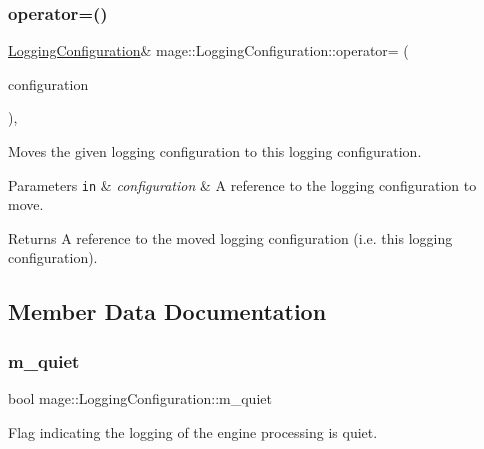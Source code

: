 \subsubsection{\texorpdfstring{operator=()}{operator=()}\hspace{0.1cm}{\footnotesize\ttfamily [2/2]}}
{\footnotesize\ttfamily \mbox{\hyperlink{classmage_1_1_logging_configuration}{Logging\+Configuration}}\& mage\+::\+Logging\+Configuration\+::operator= (\begin{DoxyParamCaption}\item[{\mbox{\hyperlink{classmage_1_1_logging_configuration}{Logging\+Configuration}} \&\&}]{configuration }\end{DoxyParamCaption})\hspace{0.3cm}{\ttfamily [default]}, {\ttfamily [noexcept]}}

Moves the given logging configuration to this logging configuration.


\begin{DoxyParams}[1]{Parameters}
\mbox{\tt in}  & {\em configuration} & A reference to the logging configuration to move. \\
\hline
\end{DoxyParams}
\begin{DoxyReturn}{Returns}
A reference to the moved logging configuration (i.\+e. this logging configuration). 
\end{DoxyReturn}


\subsection{Member Data Documentation}
\mbox{\label{classmage_1_1_logging_configuration_a38f457d5db84d15e008841ca8653b47c}} 
\subsubsection{\texorpdfstring{m\+\_\+quiet}{m\_quiet}}
{\footnotesize\ttfamily bool mage\+::\+Logging\+Configuration\+::m\+\_\+quiet\hspace{0.3cm}{\ttfamily [private]}}

Flag indicating the logging of the engine processing is quiet. \mbox{\label{classmage_1_1_logging_configuration_a60f052c2bb702d8153188e93f00427ac}} 
